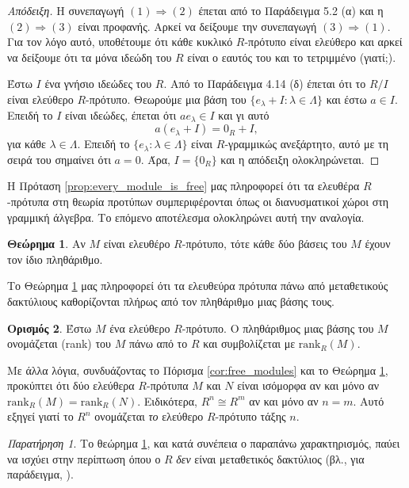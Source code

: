 \documentclass[12pt,a4paper,reqno]{amsart}
\theoremstyle{definition}
\newtheorem{theorem}{Θεώρημα}
\newtheorem{definition}[theorem]{Ορισμός}
\theoremstyle{remark}
\newtheorem*{remark}{Παρατήρηση}
\numberwithin{theorem}{section}
\numberwithin{exercise}{section}
\numberwithin{equation}{section}
\newcommand{\then}{\Rightarrow}
\newcommand{\rmrank}{\mathrm{rank}}
\newcommand{\defn}[1]{{\color{mylightblue}{#1}}}
\begin{document}
\begin{proof}[Απόδειξη]
    Η συνεπαγωγή $(1) \then (2)$ έπεται από το Παράδειγμα 5.2 (α) και η $(2) \then (3)$ είναι προφανής. Αρκεί να δείξουμε την συνεπαγωγή $(3) \then (1)$. Για τον λόγο αυτό, υποθέτουμε ότι κάθε κυκλικό $R$-πρότυπο είναι ελεύθερο και αρκεί να δείξουμε ότι τα μόνα ιδεώδη του $R$ είναι ο εαυτός του και το τετριμμένο (γιατί;). 
    
    Έστω $I$ ένα γνήσιο ιδεώδες του $R$. Από το Παράδειγμα 4.14 (δ) έπεται ότι το $R/I$ είναι ελεύθερο $R$-πρότυπο. Θεωρούμε μια βάση του $\{e_\lambda + I : \lambda \in \Lambda\}$ και έστω $a \in I$. Επειδή το $I$ είναι ιδεώδες, έπεται ότι $ae_\lambda \in I$ και γι αυτό 
    \[
    a(e_\lambda + I) = 0_R + I,
    \]
    για κάθε $\lambda \in \Lambda$. Επειδή το $\{e_\lambda : \lambda \in \Lambda\}$ είναι $R$-γραμμικώς ανεξάρτητο, αυτό με τη σειρά του σημαίνει ότι $a = 0$. Άρα, $I = \{0_R\}$ και η απόδειξη ολοκληρώνεται. 
\end{proof}

Η Πρόταση \ref{prop:every_module_is_free} μας πληροφορεί ότι τα ελευθέρα $R$-πρότυπα στη θεωρία προτύπων συμπεριφέρονται όπως οι διανυσματικοί χώροι στη γραμμική άλγεβρα. Το επόμενο αποτέλεσμα ολοκληρώνει αυτή την αναλογία.
\begin{theorem}
    \label{thm:IBN}
    Αν $M$ είναι ελευθέρο $R$-πρότυπο, τότε κάθε δύο βάσεις του $M$ έχουν τον ίδιο πληθάριθμο.
\end{theorem}

Το Θεώρημα \ref{thm:IBN} μας πληροφορεί ότι τα ελευθεύρα πρότυπα πάνω από μεταθετικούς δακτύλιους καθορίζονται πλήρως από τον πληθάριθμο μιας βάσης τους. 

\begin{definition}
    \label{def:IBN}
    Έστω $M$ ένα ελεύθερο $R$-πρότυπο. Ο πληθάριθμος μιας βάσης του $M$ ονομάζεται \defn{τάξη} (rank) του $M$ πάνω από το $R$ και συμβολίζεται με $\rmrank_R(M)$. 
\end{definition}

Με άλλα λόγια, συνδυάζοντας το Πόρισμα \ref{cor:free_modules} και το Θεώρημα \ref{thm:IBN}, προκύπτει ότι δύο ελεύθερα $R$-πρότυπα $M$ και $N$ είναι ισόμορφα αν και μόνο αν $\rmrank_R(M) = \rmrank_R(N)$. Ειδικότερα, $R^n \cong R^m$ αν και μόνο αν $n=m$. Αυτό εξηγεί γιατί το $R^n$ ονομάζεται \emph{το} ελεύθερο $R$-πρότυπο τάξης $n$. 

\begin{remark} 
    Το θεώρημα \ref{thm:IBN}, και κατά συνέπεια ο παραπάνω χαρακτηρισμός, παύει να ισχύει στην περίπτωση όπου ο $R$ \emph{δεν} είναι μεταθετικός δακτύλιος (βλ., για παράδειγμα, \cite[Άσκηση 10.3.27]{DF04}).
\end{remark}
\end{document}
